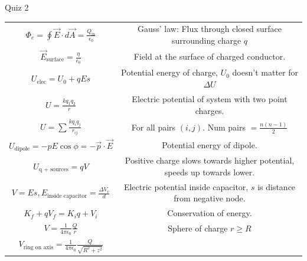 \documentclass{article}
\newcommand{\eps}{\epsilon_0}
\newcommand{\K}{\frac{1}{4 \pi \epsilon_0}}
\begin{document}
\begin{center}
\begin{section}{Quiz 2}
\begin{tabular}{|c|c|}
		 $\Phi_e = \oint \vec E \cdot d \vec A = \frac{Q_\text{in}}{\epsilon_0}$         & Gauss' law: Flux through closed surface surrounding charge $q$             \\

		 $\vec E_\text{surface} = \frac{\eta}{\eps}$                                     & Field at the surface of charged conductor.                                 \\

		 $U_\text{elec} = U_0 + qEs$                                                     & Potential energy of charge, $U_0$ doesn't matter for $\Delta U$            \\

		 $U = \frac{k q_1 q_2}{r}$                                                       & Electric potential of system with two point charges.                       \\

		 $U = \sum \frac{k q_i q_j}{r_{ij}}$                                             & For all pairs $(i,j)$. Num pairs $= \frac{n(n-1)}{2}$                      \\

		 $U_\text{dipole} = - p E \cos \phi = - \vec p \cdot \vec E$                     & Potential energy of dipole.                                                \\

		 $U_\text{q + sources} = qV$                                                     & Positive charge slows towards higher potential, speeds up towards lower.   \\

		 $V = Es, E_\text{inside capacitor} = \frac{\Delta V_v}{d}$                      & Electric potential inside capacitor, $s$ is distance from negative node.   \\

		 $K_f + q V_f = K_i q + V_i$                                                     & Conservation of energy.                                                    \\

		 $V = \K \frac{Q}{r}$                                                            & Sphere of charge $r \ge R$                                                 \\

		 $V_\text{ring on axis} = \K \frac{Q}{\sqrt{R^2 + z^2}}$                         &                                                                            \\


\end{tabular}
\end{section}
\end{center}
\end{document}
